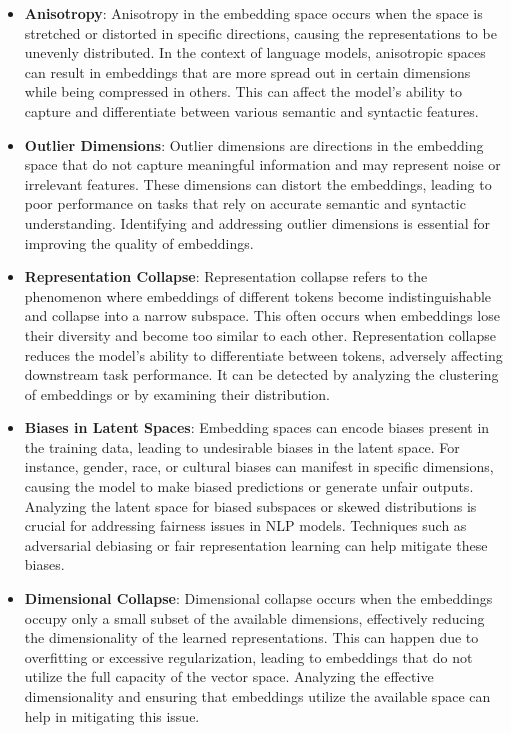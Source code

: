 \begin{itemize}
    \item \textbf{Anisotropy}: Anisotropy in the embedding space occurs when the space is stretched or distorted in specific directions, causing the representations to be unevenly distributed. In the context of language models, anisotropic spaces can result in embeddings that are more spread out in certain dimensions while being compressed in others. This can affect the model’s ability to capture and differentiate between various semantic and syntactic features. 

    \item \textbf{Outlier Dimensions}: Outlier dimensions are directions in the embedding space that do not capture meaningful information and may represent noise or irrelevant features. These dimensions can distort the embeddings, leading to poor performance on tasks that rely on accurate semantic and syntactic understanding. Identifying and addressing outlier dimensions is essential for improving the quality of embeddings.

    \item \textbf{Representation Collapse}: Representation collapse refers to the phenomenon where embeddings of different tokens become indistinguishable and collapse into a narrow subspace. This often occurs when embeddings lose their diversity and become too similar to each other. Representation collapse reduces the model's ability to differentiate between tokens, adversely affecting downstream task performance. It can be detected by analyzing the clustering of embeddings or by examining their distribution.

    \item \textbf{Biases in Latent Spaces}: Embedding spaces can encode biases present in the training data, leading to undesirable biases in the latent space. For instance, gender, race, or cultural biases can manifest in specific dimensions, causing the model to make biased predictions or generate unfair outputs. Analyzing the latent space for biased subspaces or skewed distributions is crucial for addressing fairness issues in NLP models. Techniques such as adversarial debiasing or fair representation learning can help mitigate these biases.

    \item \textbf{Dimensional Collapse}: Dimensional collapse occurs when the embeddings occupy only a small subset of the available dimensions, effectively reducing the dimensionality of the learned representations. This can happen due to overfitting or excessive regularization, leading to embeddings that do not utilize the full capacity of the vector space. Analyzing the effective dimensionality and ensuring that embeddings utilize the available space can help in mitigating this issue.


\end{itemize}
